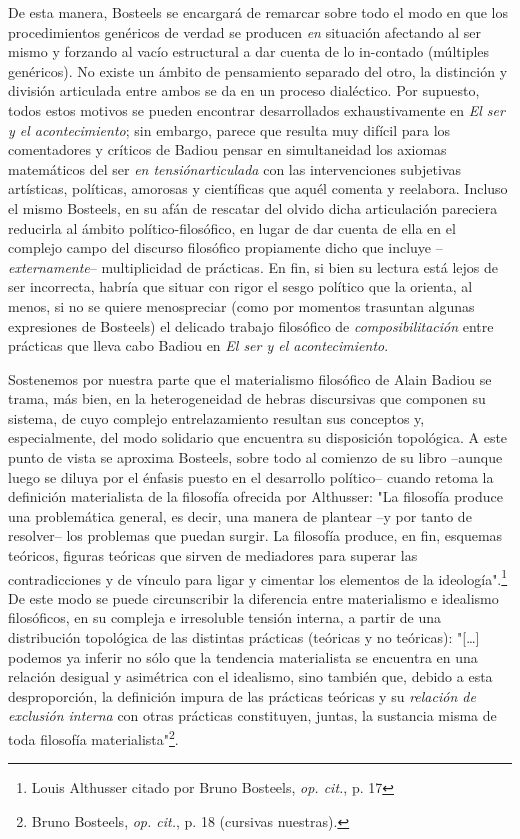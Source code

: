 \documentclass{book}
\begin{document}
De esta manera, Bosteels se encargará de remarcar sobre todo el modo en
que los procedimientos genéricos de verdad se producen \emph{en}
situación afectando al ser mismo y forzando al vacío estructural a dar
cuenta de lo in-contado (múltiples genéricos). No existe un ámbito de
pensamiento separado del otro, la distinción y división articulada entre
ambos se da en un proceso dialéctico. Por supuesto, todos estos motivos
se pueden encontrar desarrollados exhaustivamente en \emph{El ser y el
acontecimiento}; sin embargo, parece que resulta muy difícil para los
comentadores y críticos de Badiou pensar en simultaneidad los axiomas
matemáticos del ser \emph{en tensiónarticulada} con las intervenciones
subjetivas artísticas, políticas, amorosas y científicas que aquél
comenta y reelabora. Incluso el mismo Bosteels, en su afán de rescatar
del olvido dicha articulación pareciera reducirla al ámbito
político-filosófico, en lugar de dar cuenta de ella en el complejo campo
del discurso filosófico propiamente dicho que incluye
--\emph{externamente}-- multiplicidad de prácticas. En fin, si bien su
lectura está lejos de ser incorrecta, habría que situar con rigor el
sesgo político que la orienta, al menos, si no se quiere menospreciar
(como por momentos trasuntan algunas expresiones de Bosteels) el
delicado trabajo filosófico de \emph{composibilitación} entre prácticas
que lleva cabo Badiou en \emph{El ser y el acontecimiento}.

Sostenemos por nuestra parte que el materialismo filosófico de Alain
Badiou se trama, más bien, en la heterogeneidad de hebras discursivas
que componen su sistema, de cuyo complejo entrelazamiento resultan sus
conceptos y, especialmente, del modo solidario que encuentra su
disposición topológica. A este punto de vista se aproxima Bosteels,
sobre todo al comienzo de su libro --aunque luego se diluya por el
énfasis puesto en el desarrollo político-- cuando retoma la definición
materialista de la filosofía ofrecida por Althusser: "La filosofía
produce una problemática general, es decir, una manera de plantear --y
por tanto de resolver-- los problemas que puedan surgir. La filosofía
produce, en fin, esquemas teóricos, figuras teóricas que sirven de
mediadores para superar las contradicciones y de vínculo para ligar y
cimentar los elementos de la ideología".\footnote{Louis Althusser citado
  por Bruno Bosteels, \emph{op. cit.}, p. 17} De este modo se puede
circunscribir la diferencia entre materialismo e idealismo filosóficos,
en su compleja e irresoluble tensión interna, a partir de una
distribución topológica de las distintas prácticas (teóricas y no
teóricas): "{[}\ldots{]} podemos ya inferir no sólo que la tendencia
materialista se encuentra en una relación desigual y asimétrica con el
idealismo, sino también que, debido a esta desproporción, la definición
impura de las prácticas teóricas y su \emph{relación de exclusión
interna} con otras prácticas constituyen, juntas, la sustancia misma de
toda filosofía materialista"\footnote{Bruno Bosteels, \emph{op. cit.},
  p. 18 (cursivas nuestras).}.
\end{document}
